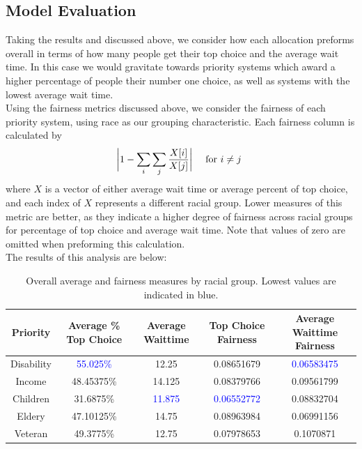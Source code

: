 \documentclass[11pt]{article}
\begin{document}
\subsection{Model Evaluation}
Taking the results and discussed above, we consider how each allocation preforms overall in terms of how many people get their top choice and the average wait time. In this case we would gravitate towards priority systems which award a higher percentage of people their number one choice, as well as systems with the lowest average wait time. \\
\newline
Using the fairness metrics discussed above, we consider the fairness of each priority system, using race as our grouping characteristic. Each fairness column is calculated by
$$
\biggr{|}1 - \sum_i \sum_j \frac{X[i]}{X[j]}\biggr{|} \quad \text{ for } i \neq j\
$$
where $X$ is a vector of either average wait time or average percent of top choice, and each index of $X$ represents a different racial group. Lower measures of this metric are better, as they indicate a higher degree of fairness across racial groups for percentage of top choice and average wait time. Note that values of zero are omitted when preforming this calculation.\\
\newline
The results of this analysis are below:
    \begin{table}[htp]
        \centering
        \begin{tabular}{c|c|c|c|c}
             Priority &  Average \% Top Choice & Average Waittime & Top Choice Fairness & Average Waittime Fairness \\
             \hline
             Disability & \textcolor{blue}{55.025\%} & 12.25 & 0.08651679 & \textcolor{blue}{0.06583475}\\
             Income & 48.45375\% & 14.125 & 0.08379766 &  0.09561799\\
             Children & 31.6875\% & \textcolor{blue}{11.875} & \textcolor{blue}{0.06552772} &  0.08832704 \\
             Eldery & 47.10125\% & 14.75 & 0.08963984 & 0.06991156 \\
             Veteran & 49.3775\% & 12.75 & 0.07978653 & 0.1070871 \\
        \end{tabular}
        \caption{Overall average and fairness measures by racial group. Lowest values are indicated in blue.}
        \label{tab:my_label}
    \end{table}
\end{document}
